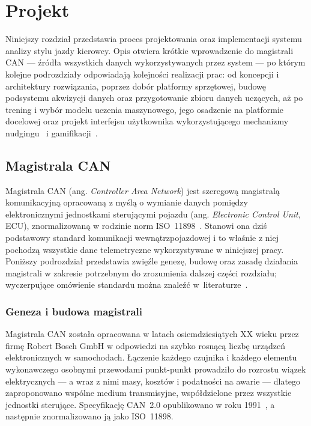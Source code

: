 \clearpage %
\section{Projekt}

Niniejszy rozdział przedstawia proces projektowania oraz implementacji systemu
analizy stylu jazdy kierowcy. Opis otwiera krótkie wprowadzenie do magistrali
CAN --- źródła wszystkich danych wykorzystywanych przez system --- po którym
kolejne podrozdziały odpowiadają kolejności realizacji prac: od koncepcji
i architektury rozwiązania, poprzez dobór platformy sprzętowej, budowę
podsystemu akwizycji danych oraz przygotowanie zbioru danych uczących, aż po
trening i wybór modelu uczenia maszynowego, jego osadzenie na platformie
docelowej oraz projekt interfejsu użytkownika wykorzystującego mechanizmy
nudgingu~\cite{thaler2008} i gamifikacji~\cite{deterding2011}.

\subsection{Magistrala CAN}
\label{sec:can}

Magistrala CAN (ang. \emph{Controller Area Network}) jest szeregową magistralą
komunikacyjną opracowaną z myślą o wymianie danych pomiędzy elektronicznymi
jednostkami sterującymi pojazdu (ang. \emph{Electronic Control Unit}, ECU),
znormalizowaną w rodzinie norm ISO~11898~\cite{iso11898}. Stanowi ona dziś
podstawowy standard komunikacji wewnątrzpojazdowej i to właśnie z niej
pochodzą wszystkie dane telemetryczne wykorzystywane w niniejszej pracy.
Poniższy podrozdział przedstawia zwięźle genezę, budowę oraz zasadę działania
magistrali w zakresie potrzebnym do zrozumienia dalszej części rozdziału;
wyczerpujące omówienie standardu można znaleźć
w~literaturze~\cite{lawrenz2013}.

\subsubsection{Geneza i budowa magistrali}

Magistrala CAN została opracowana w latach osiemdziesiątych XX wieku przez
firmę Robert Bosch GmbH w odpowiedzi na szybko rosnącą liczbę urządzeń
elektronicznych w samochodach. Łączenie każdego czujnika i każdego elementu
wykonawczego osobnymi przewodami punkt-punkt prowadziło do rozrostu wiązek
elektrycznych --- a wraz z nimi masy, kosztów i podatności na awarie ---
dlatego zaproponowano wspólne medium transmisyjne, współdzielone przez
wszystkie jednostki sterujące. Specyfikację CAN~2.0 opublikowano w roku
1991~\cite{bosch1991}, a następnie znormalizowano ją jako ISO~11898.

